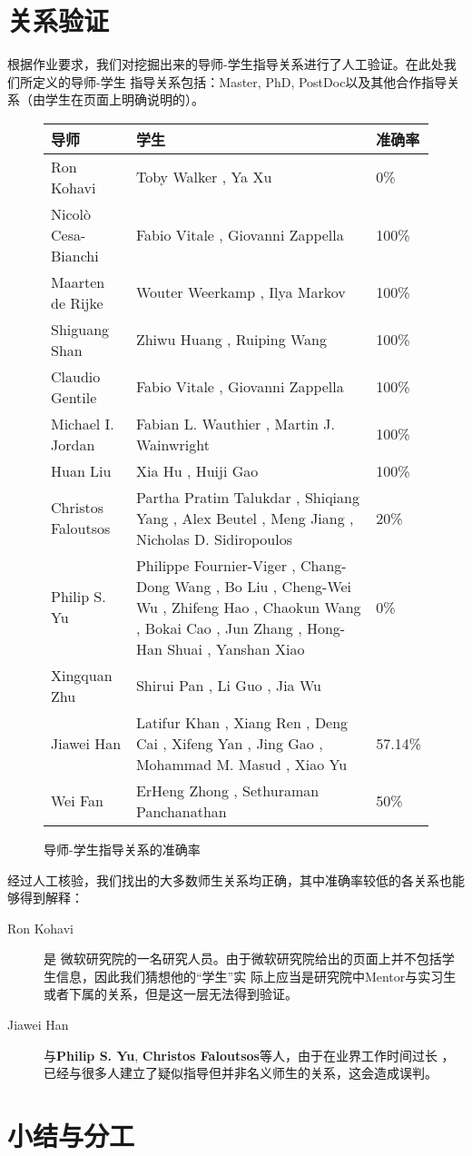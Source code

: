 \documentclass[a4paper]{article}
\begin{document}
\section{关系验证}
根据作业要求，我们对挖掘出来的导师-学生指导关系进行了人工验证。在此处我们所定义的导师-学生
指导关系包括：Master, PhD, PostDoc以及其他合作指导关系（由学生在页面上明确说明的）。

\begin{figure}[ht]
  \begin{center}
    \begin{tabular}{lm{9cm}l}
      \hline
      导师 & 学生 & 准确率 \\
      \hline
      Ron Kohavi & Toby Walker , Ya Xu  & 0\%\\
      Nicolò Cesa-Bianchi & Fabio Vitale , Giovanni Zappella  & 100\%\\
      Maarten de Rijke & Wouter Weerkamp , Ilya Markov  & 100\%\\
      Shiguang Shan & Zhiwu Huang , Ruiping Wang  & 100\%\\
      Claudio Gentile & Fabio Vitale , Giovanni Zappella  & 100\%\\
      Michael I. Jordan & Fabian L. Wauthier , Martin J. Wainwright  & 100\% \\
      Huan Liu & Xia Hu , Huiji Gao  & 100\%\\
      Christos Faloutsos & Partha Pratim Talukdar , Shiqiang Yang , Alex Beutel , Meng Jiang , Nicholas D.
      Sidiropoulos  & 20\%\\
      Philip S. Yu & Philippe Fournier-Viger , Chang-Dong Wang , Bo Liu , Cheng-Wei Wu , Zhifeng Hao ,
      Chaokun Wang , Bokai Cao , Jun Zhang , Hong-Han Shuai , Yanshan Xiao  & 0\%\\
      Xingquan Zhu & Shirui Pan , Li Guo , Jia Wu  & \\
      Jiawei Han & Latifur Khan , Xiang Ren , Deng Cai , Xifeng Yan , Jing Gao , Mohammad M. Masud , Xiao
      Yu  & 57.14\%\\
      Wei Fan & ErHeng Zhong , Sethuraman Panchanathan  & 50\%\\
      \hline
    \end{tabular}
  \end{center}
  \caption{导师-学生指导关系的准确率}
\end{figure}

经过人工核验，我们找出的大多数师生关系均正确，其中准确率较低的各关系也能够得到解释：
\begin{description}
  \item[Ron Kohavi] 是
    微软研究院的一名研究人员。由于微软研究院给出的页面上并不包括学生信息，因此我们猜想他的``学生''实
    际上应当是研究院中Mentor与实习生或者下属的关系，但是这一层无法得到验证。
  \item[Jiawei Han] 与\textbf{Philip S. Yu}, \textbf{Christos Faloutsos}等人，由于在业界工作时间过长
    ，已经与很多人建立了疑似指导但并非名义师生的关系，这会造成误判。
\end{description}

\section{小结与分工}
\end{document}
